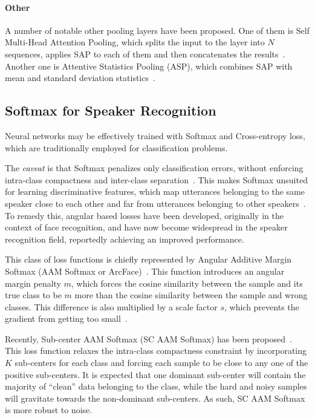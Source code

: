 \documentclass[conference]{IEEEtran}
\begin{document}
\paragraph{Other}A number of notable other pooling layers have been proposed. One of them is Self Multi-Head Attention Pooling, which splits the input to the layer into $N$ sequences, applies SAP to each of them and then concatenates the results~\cite{india2019selfmha}. Another one is Attentive Statistics Pooling (ASP), which combines SAP with mean and standard deviation statistics~\cite{okabe2018asp}.

\subsection{Softmax for Speaker Recognition}

Neural networks may be effectively trained with Softmax and Cross-entropy loss, which are traditionally employed for classification problems. 

The \textit{caveat} is that Softmax penalizes only classification errors, without enforcing intra-class compactness and inter-class separation~\cite{chung2020defence}. This makes Softmax unsuited for learning discriminative features, which map utterances belonging to the same speaker close to each other and far from utterances belonging to other speakers~\cite{liu2019large}. To remedy this, angular based losses have been developed, originally in the context of face recognition, and have now become widespread in the speaker recognition field, reportedly achieving an improved performance.

This class of loss functions is chiefly represented by Angular Additive Margin Softmax (AAM Softmax or ArcFace)~\cite{deng2019arcface}. This function introduces an angular margin penalty $m$, which forces the cosine similarity between the sample and its true class to be $m$ more than the cosine similarity between the sample and wrong classes. This difference is also multiplied by a scale factor $s$, which prevents the gradient from getting too small~\cite{chung2020defence,hajibabaei2018unified}.

Recently, Sub-center AAM Softmax (SC AAM Softmax) has been proposed~\cite{deng2020subarcface}. This loss function relaxes the intra-class compactness constraint by incorporating $K$ sub-centers for each class and forcing each sample to be close to any one of the positive sub-centers. It is expected that one dominant sub-center will contain the majority of ``clean'' data belonging to the class, while the hard and noisy samples will gravitate towards the non-dominant sub-centers. As such, SC AAM Softmax is more robust to noise.
\end{document}
